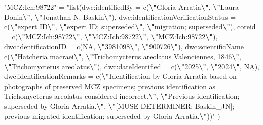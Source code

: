 \documentclass[sn-apa,pdflatex]{sn-jnl}
\newenvironment{Shaded}{\begin{snugshade}}{\end{snugshade}}
\newcommand{\NormalTok}[1]{#1}
\newcommand{\OtherTok}[1]{\textcolor[rgb]{0.56,0.35,0.01}{#1}}
\newcommand{\SpecialCharTok}[1]{\textcolor[rgb]{0.81,0.36,0.00}{\textbf{#1}}}
\newcommand{\StringTok}[1]{\textcolor[rgb]{0.31,0.60,0.02}{#1}}
\begin{document}
\begin{Shaded}
\begin{Highlighting}[]
  \StringTok{"MCZ:Ich:98722"} \OtherTok{=}
    \StringTok{"list(\textasciigrave{}dwc:identifiedBy\textasciigrave{} = c(}\SpecialCharTok{\textbackslash{}"}\StringTok{Gloria Arratia}\SpecialCharTok{\textbackslash{}"}\StringTok{, }\SpecialCharTok{\textbackslash{}"}\StringTok{Laura Donin}\SpecialCharTok{\textbackslash{}"}\StringTok{, }\SpecialCharTok{\textbackslash{}"}\StringTok{Jonathan N. Baskin}\SpecialCharTok{\textbackslash{}"}\StringTok{), \textasciigrave{}dwc:identificationVerificationStatus\textasciigrave{} = c(}\SpecialCharTok{\textbackslash{}"}\StringTok{expert ID}\SpecialCharTok{\textbackslash{}"}\StringTok{, }\SpecialCharTok{\textbackslash{}"}\StringTok{expert ID; superseded}\SpecialCharTok{\textbackslash{}"}\StringTok{, }\SpecialCharTok{\textbackslash{}"}\StringTok{migration; superseded}\SpecialCharTok{\textbackslash{}"}\StringTok{), coreid = c(}\SpecialCharTok{\textbackslash{}"}\StringTok{MCZ:Ich:98722}\SpecialCharTok{\textbackslash{}"}\StringTok{, }\SpecialCharTok{\textbackslash{}"}\StringTok{MCZ:Ich:98722}\SpecialCharTok{\textbackslash{}"}\StringTok{, }\SpecialCharTok{\textbackslash{}"}\StringTok{MCZ:Ich:98722}\SpecialCharTok{\textbackslash{}"}\StringTok{), \textasciigrave{}dwc:identificationID\textasciigrave{} = c(NA, }\SpecialCharTok{\textbackslash{}"}\StringTok{3981098}\SpecialCharTok{\textbackslash{}"}\StringTok{, }\SpecialCharTok{\textbackslash{}"}\StringTok{900726}\SpecialCharTok{\textbackslash{}"}\StringTok{), \textasciigrave{}dwc:scientificName\textasciigrave{} = c(}\SpecialCharTok{\textbackslash{}"}\StringTok{Hatcheria macraei}\SpecialCharTok{\textbackslash{}"}\StringTok{, }\SpecialCharTok{\textbackslash{}"}\StringTok{Trichomycterus areolatus Valenciennes, 1846}\SpecialCharTok{\textbackslash{}"}\StringTok{, }\SpecialCharTok{\textbackslash{}"}\StringTok{Trichomycterus areolatus}\SpecialCharTok{\textbackslash{}"}\StringTok{), \textasciigrave{}dwc:dateIdentified\textasciigrave{} = c(}\SpecialCharTok{\textbackslash{}"}\StringTok{2025}\SpecialCharTok{\textbackslash{}"}\StringTok{, }\SpecialCharTok{\textbackslash{}"}\StringTok{2024}\SpecialCharTok{\textbackslash{}"}\StringTok{, NA), \textasciigrave{}dwc:identificationRemarks\textasciigrave{} = c(}\SpecialCharTok{\textbackslash{}"}\StringTok{Identification by Gloria Arratia based on photographs of preserved MCZ specimens; previous identification as Trichomycterus areolatus considered incorrect.}\SpecialCharTok{\textbackslash{}"}\StringTok{, }\SpecialCharTok{\textbackslash{}"}\StringTok{Previous identification; superseded by Gloria Arratia.}\SpecialCharTok{\textbackslash{}"}\StringTok{, }\SpecialCharTok{\textbackslash{}"}\StringTok{[MUSE DETERMINER: Baskin\_JN]; previous migrated identification; superseded by Gloria Arratia.}\SpecialCharTok{\textbackslash{}"}\StringTok{))"}
\NormalTok{)}


\end{Highlighting}
\end{Shaded}
\end{document}

